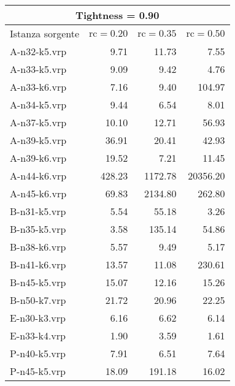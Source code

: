 \documentclass[11pt,oneside,a4paper]{article}
\begin{document}
\begin{table}
\centering
\begin{tabular}{|l|r|r|r|}
\hline
\multicolumn{4}{|c|}{Tightness = 0.90} \\
\hline
Istanza sorgente & $\text{rc}=0.20$ & $\text{rc}=0.35$ & $\text{rc}=0.50$ \\
\hline

A-n32-k5.vrp & 9.71 & 11.73 & 7.55 \\
A-n33-k5.vrp & 9.09 & 9.42 & 4.76 \\
A-n33-k6.vrp & 7.16 & 9.40 & 104.97 \\
A-n34-k5.vrp & 9.44 & 6.54 & 8.01 \\
A-n37-k5.vrp & 10.10 & 12.71 & 56.93 \\
A-n39-k5.vrp & 36.91 & 20.41 & 42.93 \\
A-n39-k6.vrp & 19.52 & 7.21 & 11.45 \\
A-n44-k6.vrp & 428.23 & 1172.78 & 20356.20 \\
A-n45-k6.vrp & 69.83 & 2134.80 & 262.80 \\
B-n31-k5.vrp & 5.54 & 55.18 & 3.26 \\
B-n35-k5.vrp & 3.58 & 135.14 & 54.86 \\
B-n38-k6.vrp & 5.57 & 9.49 & 5.17 \\
B-n41-k6.vrp & 13.57 & 11.08 & 230.61 \\
B-n45-k5.vrp & 15.07 & 12.16 & 15.26 \\
B-n50-k7.vrp & 21.72 & 20.96 & 22.25 \\
E-n30-k3.vrp & 6.16 & 6.62 & 6.14 \\
E-n33-k4.vrp & 1.90 & 3.59 & 1.61 \\
P-n40-k5.vrp & 7.91 & 6.51 & 7.64 \\
P-n45-k5.vrp & 18.09 & 191.18 & 16.02 \\


\end{tabular}
\end{table}
\end{document}
